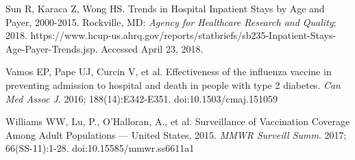 \documentclass[english, 12pt]{article}
\begin{document}
\begin{thebibliography}{20}
 Sun R, Karaca Z, Wong HS. Trends in Hospital Inpatient Stays by Age and Payer, 2000-2015. Rockville, MD: {\em Agency for Healthcare Research and Quality}; 2018. https://www.hcup-us.ahrq.gov/reports/statbriefs/sb235-Inpatient-Stays-Age-Payer-Trends.jsp. Accessed April 23, 2018.

 Vamos EP, Pape UJ, Curcin V, et al. Effectiveness of the influenza vaccine in preventing admission to hospital and death in people with type 2 diabetes. {\em Can Med Assoc J}. 2016; 188(14):E342-E351. doi:10.1503/cmaj.151059

 Williams WW, Lu, P., O’Halloran, A., et al. Surveillance of Vaccination Coverage Among Adult Populations — United States, 2015. {\em MMWR Surveill Summ}. 2017; 66(SS-11):1-28. doi:10.15585/mmwr.ss6611a1

\end{thebibliography}
\end{document}
